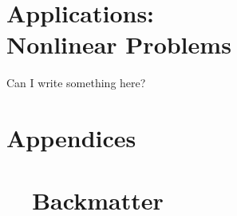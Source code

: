 \documentclass[10pt]{newsiambook}
\begin{document}




\part{Applications:\\Nonlinear Problems}
Can I write something here?





\part{Appendices}
\appendix

%
%
%
%

\part{\ \ Backmatter}
\backmatter
%
%
%
%



\printindex
\end{document}

